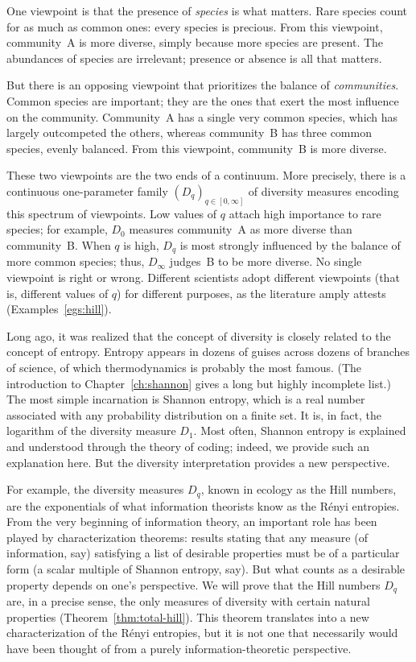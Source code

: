 One viewpoint%
%
% 
is that the presence of \emph{species} is what matters.  Rare
species count for as much as common ones: every species is precious.  From
this viewpoint, community~A is more diverse, simply because more species
are present.  The abundances of species are irrelevant; presence or absence
is all that matters.

But there is an opposing viewpoint that prioritizes the balance of
\emph{communities}.  Common species are important; they are the ones that
exert the most influence on the community.  Community~A has a single very
common species, which has largely outcompeted the others, whereas
community~B has three common species, evenly balanced.  From this
viewpoint, community~B is more diverse.

These two viewpoints are the two ends of a continuum.  More precisely,
there is a continuous one-parameter family $(D_q)_{q \in [0, \infty]}$ of
diversity measures encoding this spectrum of viewpoints.  Low values of $q$
attach high importance to rare species; for example, $D_0$ measures
community~A as more diverse than community~B.  When $q$ is high, $D_q$ is
most strongly influenced by the balance of more common species; thus,
$D_\infty$ judges~B to be more diverse.  No single viewpoint is right or
wrong.  Different scientists adopt different viewpoints (that is, different
values of $q$) for different purposes, as the literature amply attests
(Examples~\ref{egs:hill}).

Long ago, it was realized that the concept of diversity is closely related
to the concept of entropy.  Entropy appears in dozens of guises across
dozens of branches of science, of which thermodynamics is probably the most
famous.  (The introduction to Chapter~\ref{ch:shannon} gives a long but
highly incomplete list.)  The most simple incarnation is Shannon entropy,
which is a real number associated with any probability distribution on a
finite set.  It is, in fact, the logarithm of the diversity measure $D_1$.
Most often, Shannon entropy is explained and understood through the theory
of coding; indeed, we provide such an explanation here.  But the diversity
interpretation provides a new perspective.

For example, the diversity measures $D_q$, known in ecology as the
Hill%
%
%
numbers, are the exponentials of what information theorists know as the
R\'enyi%
%
% 
entropies.  From the very beginning of information theory, an
important role has been played by characterization theorems: results
stating that any measure (of information, say) satisfying a list of
desirable properties must be of a particular form (a scalar
multiple of Shannon entropy, say).  But what counts as a desirable
property depends on one's perspective.  We will prove that the Hill numbers
$D_q$ are, in a precise sense, the only measures of diversity with
certain natural properties (Theorem~\ref{thm:total-hill}).  This theorem
translates into a new characterization of the R\'enyi entropies, but it is
not one that necessarily would have been thought of from a purely
information-theoretic perspective.  

